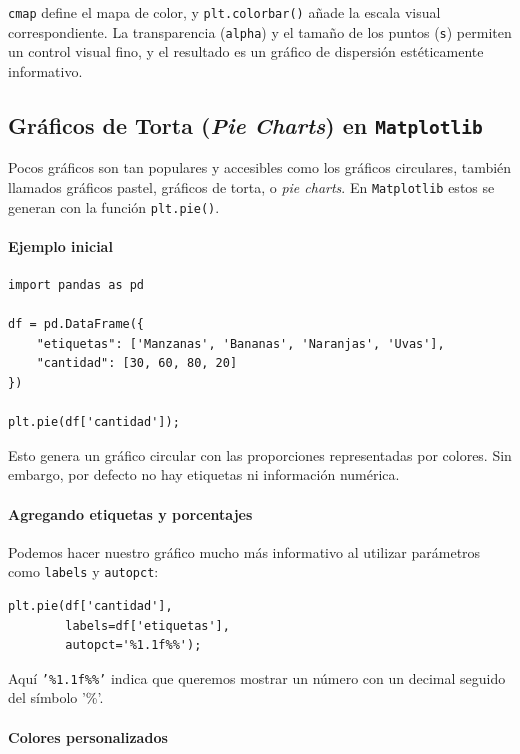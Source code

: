 \documentclass{article}
\theoremstyle{nonumberplain}
\begin{document}
\texttt{cmap} define el mapa de color, y \texttt{plt.colorbar()} añade la escala visual correspondiente. La transparencia (\texttt{alpha}) y el tamaño de los puntos (\texttt{s}) permiten un control visual fino, y el resultado es un gráfico de dispersión estéticamente informativo.

\vspace{1em}

\subsection*{Gráficos de Torta (\textit{Pie Charts}) en \texttt{Matplotlib}}

Pocos gráficos son tan populares y accesibles como los gráficos circulares, también llamados gráficos pastel, gráficos de torta, o \textit{pie charts}. En \texttt{Matplotlib} estos se generan con la función \texttt{plt.pie()}.

\paragraph{Ejemplo inicial}

\begin{verbatim}
import pandas as pd

df = pd.DataFrame({
    "etiquetas": ['Manzanas', 'Bananas', 'Naranjas', 'Uvas'],
    "cantidad": [30, 60, 80, 20]
})

plt.pie(df['cantidad']);
\end{verbatim}

Esto genera un gráfico circular con las proporciones representadas por colores. Sin embargo, por defecto no hay etiquetas ni información numérica.

\paragraph{Agregando etiquetas y porcentajes}

Podemos hacer nuestro gráfico mucho más informativo al utilizar parámetros como \texttt{labels} y \texttt{autopct}:

\begin{verbatim}
plt.pie(df['cantidad'],
        labels=df['etiquetas'],
        autopct='%1.1f%%');
\end{verbatim}

Aquí \texttt{'\%1.1f\%\%'} indica que queremos mostrar un número con un decimal seguido del símbolo '\%'.

\paragraph{Colores personalizados}
\end{document}
